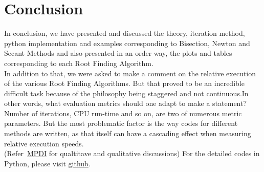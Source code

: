 \documentclass[a4paper, 12pt]{report}
\begin{document}
\chapter{Conclusion}
In conclusion, we have presented and discussed the theory, iteration method, python implementation and examples corresponding to Bisection, Newton and Secant Methods and also presented in an order way, the plots and tables corresponding to each Root Finding Algorithm.\\
In addition to that, we were asked to make a comment on the relative execution of the various Root Finding Algorithms. But that proved to be an incredible difficult task because of the philosophy being staggered and not continuous.In other words, what evaluation metrics should one adapt to make a statement? Number of iterations, CPU run-time and so on, are two of numerous metric parameters. But the most problematic factor is the way codes for different methods are written, as that itself can have a cascading effect when measuring relative execution speeds.\\
(Refer~\href{https://www.mdpi.com/2227-7390/9/11/1306/htm}{MPDI} for qualtitave and qualitative discussions)
For the detailed codes in Python, please visit \href{https://github.com/YashIITM/Root-Finding-Algorithms}{github}.

    \printbibliography

    \appendix

  
\end{document}
